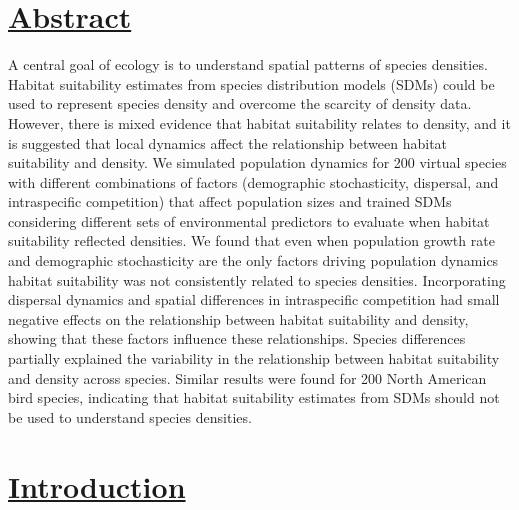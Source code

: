 
\section*{\textbf{\underline{Abstract}}}
A central goal of ecology is to understand spatial patterns of species densities. Habitat suitability estimates from species distribution models (SDMs) could be used to represent species density and overcome the scarcity of density data. However, there is mixed evidence that habitat suitability relates to density, and it is suggested that local dynamics affect the relationship between habitat suitability and density. We simulated population dynamics for 200 virtual species with different combinations of factors (demographic stochasticity, dispersal, and intraspecific competition) that affect population sizes and trained SDMs considering different sets of environmental predictors to evaluate when habitat suitability reflected densities. We found that even when population growth rate and demographic stochasticity are the only factors driving population dynamics habitat suitability was not consistently related to species densities. Incorporating dispersal dynamics and spatial differences in intraspecific competition had small negative effects on the relationship between habitat suitability and density, showing that these factors influence these relationships. Species differences partially explained the variability in the relationship between habitat suitability and density across species. Similar results were found for 200 North American bird species, indicating that habitat suitability estimates from SDMs should not be used to understand species densities.

\section*{\textbf{\underline{Introduction}}}


